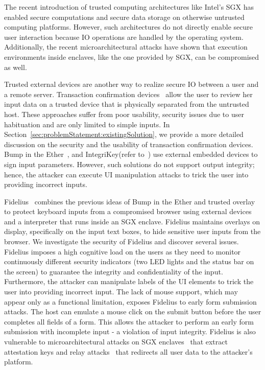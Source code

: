 The recent introduction of trusted computing architectures like Intel's SGX has enabled secure computations and secure data storage on otherwise untrusted computing platforms. However, such architectures do not directly enable secure user interaction because IO operations are handled by the operating system. Additionally, the recent microarchitectural attacks have shown that execution environments inside enclaves, like the one provided by SGX, can be compromised as well.


Trusted external devices are another way to realize secure IO between a user and a remote server. Transaction confirmation devices~\cite{filyanov2011uni,weigold2011secure,parno2006phoolproof} allow the user to review her input data on a trusted device that is physically separated from the untrusted host. These approaches suffer from poor usability, security issues due to user habituation and are only limited to simple inputs. In Section~\ref{sec:problemStatement:existingSolution}, we provide a more detailed discussion on the security and the usability of transaction confirmation devices. Bump in the Ether~\cite{McCPerRei2006}, and IntegriKey(refer to~) use external embedded devices to sign input parameters. However, such solutions do not support output integrity; hence, the attacker can execute UI manipulation attacks to trick the user into providing incorrect inputs. 

Fidelius~\cite{Fidelius} combines the previous ideas of Bump in the Ether and trusted overlay to protect keyboard inputs from a compromised browser using external devices and a \js interpreter that runs inside an SGX enclave. Fidelius maintains overlays on display, specifically on the input text boxes, to hide sensitive user inputs from the browser. We investigate the security of Fidelius and discover several issues. Fidelius imposes a high cognitive load on the users as they need to monitor continuously different security indicators (two LED lights and the status bar on the screen) to guarantee the integrity and confidentiality of the input. Furthermore, the attacker can manipulate labels of the UI elements to trick the user into providing incorrect input. 
The lack of mouse support, which may appear only as a functional limitation, exposes Fidelius to early form submission attacks. The host can emulate a mouse click on the submit button before the user completes all fields of a form.
This allows the attacker to perform an early form submission with incomplete input - a violation of input integrity. Fidelius is also vulnerable to microarchitectural attacks on SGX enclaves~\cite{van2018foreshadow} that extract attestation keys and relay attacks~\cite{dhar2018proximitee} that redirects all user data to the attacker's platform.


